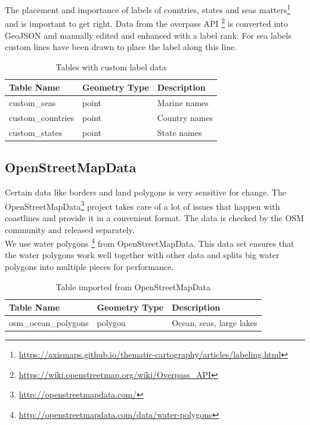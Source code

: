 The placement and importance of labels of countries, states and seas matters\footnote{\url{https://axismaps.github.io/thematic-cartography/articles/labeling.html}} and is important to get right. Data from the overpass API \footnote{\url{https://wiki.openstreetmap.org/wiki/Overpass_API}} is converted into GeoJSON and
manually edited and enhanced with a label rank. For sea labels custom lines have been drawn to place the label along this line.

\begin{table}[H]
\centering
    \begin{tabular}{lll}
    \hline
    Table Name   & Geometry Type & Description \\
    \hline                                          
    custom\_seas       & point    & Marine names \\
    custom\_countries    & point    & Country names \\
    custom\_states       & point    & State names \\
    \end{tabular}
    \caption{Tables with custom label data}
\end{table}

\subsection{OpenStreetMapData}

Certain \osm{} data like borders and land polygons is very sensitive for change.
The OpenStreetMapData\footnote{\url{http://openstreetmapdata.com/}}
project takes care of a lot of issues that happen with coastlines
and provide it in a convenient format. The data is checked by the OSM community
and released separately.
\\
We use water polygons \footnote{\url{http://openstreetmapdata.com/data/water-polygons}} from OpenStreetMapData. This data set ensures that the water polygons
work well together with other \osm{} data and splits big water polygons into multiple 
pieces for performance.

\begin{table}[H]
\centering
    \begin{tabular}{lll}
    \hline
    Table Name            & Geometry Type & Description \\
    \hline
    osm\_ocean\_polygons        & polygon       & Ocean, seas, large lakes           \\
    \end{tabular}
    \caption{Table imported from OpenStreetMapData}
\end{table}

